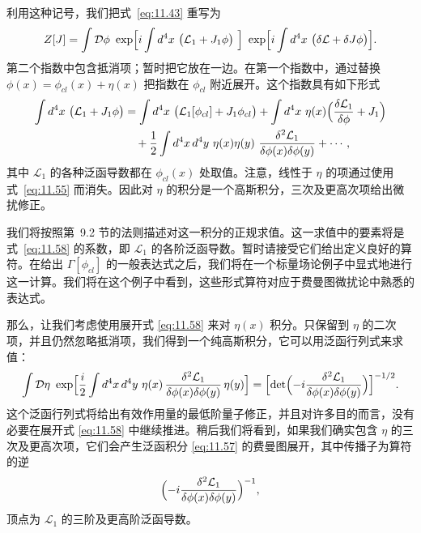利用这种记号，我们把式~\eqref{eq:11.43} 重写为
\begin{equation}
  Z[J] = \int \mathcal{D}\phi\ \exp\Bigl[ i\int d^4x\ \bigl(
    \mathcal{L}_1 + J_1\phi \bigr)\ \Bigr]\ \exp\Bigl[ i\int d^4x\ \bigl(
      \delta\mathcal{L} + \delta J\phi \bigr) \Bigr] .
  \label{eq:11.57}
\end{equation}
第二个指数中包含抵消项；暂时把它放在一边。在第一个指数中，通过替换 $\phi(x) = \phi_{cl}(x) + \eta(x)$ 把指数在 $\phi_{cl}$ 附近展开。这个指数具有如下形式
\begin{equation}
  \begin{aligned}
    \int d^4x\ \bigl( \mathcal{L}_1 + J_1\phi \bigr)
    &= \int d^4x\ \bigl( \mathcal{L}_1[\phi_{cl}] + J_1\phi_{cl} \bigr)
      + \int d^4x\ \eta(x)\Bigl( \frac{\delta\mathcal{L}_1}{\delta\phi}
        + J_1 \Bigr)\\
    &\quad + \frac{1}{2}\int d^4x\,d^4y\ \eta(x)\eta(y)\
      \frac{\delta^2\mathcal{L}_1}{\delta\phi(x)\delta\phi(y)}
      + \cdots ,
  \end{aligned}
  \label{eq:11.58}
\end{equation}
其中 $\mathcal{L}_1$ 的各种泛函导数都在 $\phi_{cl}(x)$ 处取值。注意，线性于 $\eta$ 的项通过使用式~\eqref{eq:11.55} 而消失。因此对 $\eta$ 的积分是一个高斯积分，三次及更高次项给出微扰修正。

我们将按照第~9.2 节的法则描述对这一积分的正规求值。这一求值中的要素将是式~\eqref{eq:11.58} 的系数，即 $\mathcal{L}_1$ 的各阶泛函导数。暂时请接受它们给出定义良好的算符。在给出 $\Gamma[\phi_{cl}]$ 的一般表达式之后，我们将在一个标量场论例子中显式地进行这一计算。我们将在这个例子中看到，这些形式算符对应于费曼图微扰论中熟悉的表达式。

那么，让我们考虑使用展开式 \eqref{eq:11.58} 来对 $\eta(x)$ 积分。只保留到 $\eta$ 的二次项，并且仍然忽略抵消项，我们得到一个纯高斯积分，它可以用泛函行列式来求值：
\begin{equation}
  \int \mathcal{D}\eta\ \exp\Bigl[ \frac{i}{2}\int d^4x\,d^4y\
    \eta(x)\,\frac{\delta^2\mathcal{L}_1}{\delta\phi(x)\delta\phi(y)}\,
    \eta(y) \Bigr] = \Bigl[ \det\Bigl( -i\frac{\delta^2\mathcal{L}_1}
      {\delta\phi(x)\delta\phi(y)} \Bigr) \Bigr]^{-1/2} .
  \label{eq:11.59}
\end{equation}
这个泛函行列式将给出有效作用量的最低阶量子修正，并且对许多目的而言，没有必要在展开式 \eqref{eq:11.58} 中继续推进。稍后我们将看到，如果我们确实包含 $\eta$ 的三次及更高次项，它们会产生泛函积分 \eqref{eq:11.57} 的费曼图展开，其中传播子为算符的逆
\begin{equation}
  \Bigl( -i\frac{\delta^2\mathcal{L}_1}{\delta\phi(x)\delta\phi(y)}
    \Bigr)^{-1} ,
  \label{eq:11.60}
\end{equation}
顶点为 $\mathcal{L}_1$ 的三阶及更高阶泛函导数。

